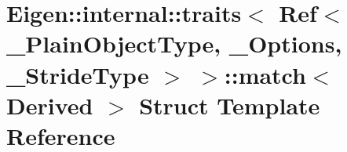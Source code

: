 \hypertarget{struct_eigen_1_1internal_1_1traits_3_01_ref_3_01___plain_object_type_00_01___options_00_01___stride_type_01_4_01_4_1_1match}{}\section{Eigen\+:\+:internal\+:\+:traits$<$ Ref$<$ \+\_\+\+Plain\+Object\+Type, \+\_\+\+Options, \+\_\+\+Stride\+Type $>$ $>$\+:\+:match$<$ Derived $>$ Struct Template Reference}
\label{struct_eigen_1_1internal_1_1traits_3_01_ref_3_01___plain_object_type_00_01___options_00_01___stride_type_01_4_01_4_1_1match}
